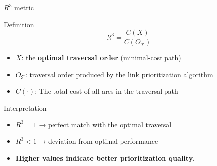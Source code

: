 
\begin{frame}{$R^{3}$ metric}
  \begin{block}{Definition}
    \[
      R^{3} = \frac{C(X)}{C(O_{\mathcal{T}})}
    \]
  \end{block}

  \begin{itemize}
    \item $X$: the \textbf{optimal traversal order} (minimal-cost path)
    \item $O_{\mathcal{T}}$: traversal order produced by the link prioritization algorithm
    \item $C(\cdot)$: The total cost of all arcs in the traversal path
  \end{itemize}
  \vspace{0.8em}
  \begin{exampleblock}{Interpretation}
    \begin{itemize}
      \item $R^{3} = 1$ → perfect match with the optimal traversal  
      \item $R^{3} < 1$ → deviation from optimal performance  
      \item \textbf{Higher values indicate better prioritization quality.}
    \end{itemize}
  \end{exampleblock}

\end{frame}
